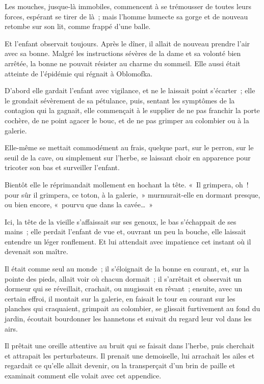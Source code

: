 \documentclass[french,twoside]{book} %
\begin{document}
Les mouches, jusque-là immobiles, commencent à se trémousser de toutes leurs forces, espérant se tirer de là ; mais l’homme humecte sa gorge et de nouveau retombe sur son lit, comme frappé d’une balle.\par
Et l’enfant observait toujours. Après le dîner, il allait de nouveau prendre l’air avec sa bonne. Malgré les instructions sévères de la dame et sa volonté bien arrêtée, la bonne ne pouvait résister au charme du sommeil. Elle aussi était atteinte de l’épidémie qui régnait à Oblomofka.\par
D’abord elle gardait l’enfant avec vigilance, et ne le laissait point s’écarter ; elle le grondait sévèrement de sa pétulance, puis, sentant les symptômes de la contagion qui la gagnait, elle commençait à le supplier de ne pas franchir la porte cochère, de ne point agacer le bouc, et de ne pas grimper au colombier ou à la galerie.\par
Elle-même se mettait commodément au frais, quelque part, sur le perron, sur le seuil de la cave, ou simplement sur l’herbe, se laissant choir en apparence pour tricoter son bas et surveiller l’enfant.\par
Bientôt elle le réprimandait mollement en hochant la tête. « Il grimpera, oh ! pour sûr il grimpera, ce toton, à la galerie, » murmurait-elle en dormant presque, ou bien encore, « pourvu que dans la cavée… »\par
Ici, la tête de la vieille s’affaissait sur ses genoux, le bas s’échappait de ses mains ; elle perdait l’enfant de vue et, ouvrant un peu la bouche, elle laissait entendre un léger ronflement. Et lui attendait avec impatience cet instant où il devenait son maître.\par
Il était comme seul au monde ; il s’éloignait de la bonne en courant, et, sur la pointe des pieds, allait voir où chacun dormait ; il s’arrêtait et observait un dormeur qui se réveillait, crachait, ou mugissait en rêvant ; ensuite, avec un certain effroi, il montait sur la galerie, en faisait le tour en courant sur les planches qui craquaient, grimpait au colombier, se glissait furtivement au fond du jardin, écoutait bourdonner les hannetons et suivait du regard leur vol dans les airs.\par
Il prêtait une oreille attentive au bruit qui se faisait dans l’herbe, puis cherchait et attrapait les perturbateurs. Il prenait une demoiselle, lui arrachait les ailes et regardait ce qu’elle allait devenir, ou la transperçait d’un brin de paille et examinait comment elle volait avec cet appendice.\par
\end{document}

